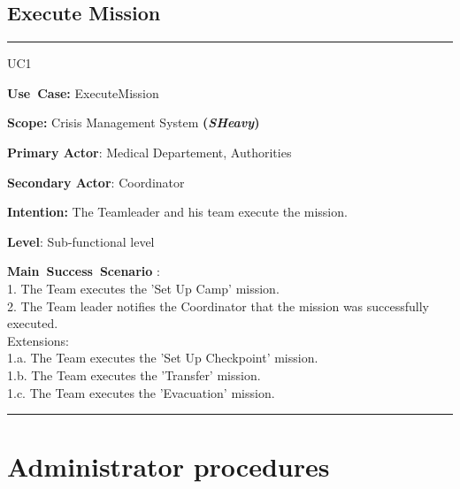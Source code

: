 \subsection{Execute Mission}
\vspace{0.5cm}
\hrule
\vspace{0.5cm}
\begin{lyxlist}{UC1}
\small{
\item [\textbf{Use~Case:}] ExecuteMission
\item [\textbf{Scope:}] Crisis Management System \textbf{(\emph{SHeavy})}
\item [\textbf{Primary Actor}:] Medical Departement, Authorities
\item [\textbf{Secondary Actor}:] Coordinator
\item [\textbf{Intention:}]The Teamleader and his team execute the mission.
\item [\textbf{Level}:]Sub-functional level
\item [\textbf{Main~Success~Scenario}]:\\
1. The Team  executes the 'Set Up Camp' mission.\\
2. The Team leader notifies the Coordinator that the mission was successfully
executed.\\
 Extensions:\\
	1.a. The Team  executes the 'Set Up Checkpoint' mission.\\
	1.b. The Team  executes the 'Transfer' mission.\\
	1.c. The Team  executes the 'Evacuation' mission.\\
}
\end{lyxlist}
\hrule 
\vspace{0.5cm} 


\section{Administrator procedures}

